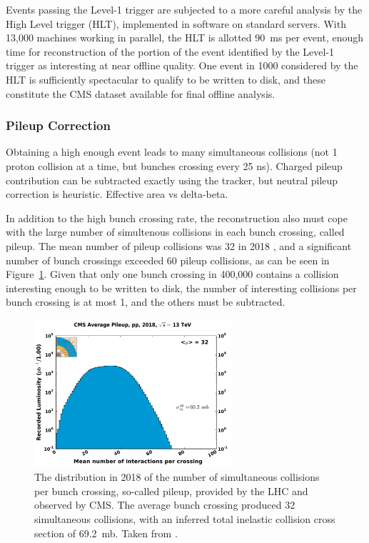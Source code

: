     Events passing the Level-1 trigger are subjected to a more careful analysis by the High Level trigger (HLT), implemented in software on standard servers.
    With 13,000 machines working in parallel, the HLT is allotted 90~ms per event, enough time for reconstruction of the portion of the event identified by the Level-1 trigger as interesting at near offline quality.
    One event in 1000 considered by the HLT is sufficiently spectacular to qualify to be written to disk, and these constitute the CMS dataset available for final offline analysis.

    \subsubsection{Pileup Correction} \label{sec:pileup}

    Obtaining a high enough event leads to many simultaneous collisions (not 1 proton collision at a time, but bunches crossing every 25 ns).
    Charged pileup contribution can be subtracted exactly using the tracker, but neutral pileup correction is heuristic.
    Effective area vs delta-beta.

    In addition to the high bunch crossing rate, the reconstruction also must cope with the large number of simultenous collisions in each bunch crossing, called pileup.
    The mean number of pileup collisions was 32 in 2018 \cite{lumipublic}, and a significant number of bunch crossings exceeded 60 pileup collisions, as can be seen in Figure~\ref{fig:pileup}.
    Given that only one bunch crossing in 400,000 contains a collision interesting enough to be written to disk, the number of interesting collisions per bunch crossing is at most 1, and the others must be subtracted.

    \begin{figure}[h!]
      \centering
      \includegraphics[width=0.65\textwidth]{figures/pileup.pdf}
      \caption[Pileup distribution in 2018.]{
        The distribution in 2018 of the number of simultaneous collisions per bunch crossing, so-called pileup, provided by the LHC and observed by CMS.
        The average bunch crossing produced 32 simultaneous collisions, with an inferred total inelastic collision cross section of 69.2~mb.
        Taken from \cite{lumipublic}.}
      \label{fig:pileup}
    \end{figure}  

